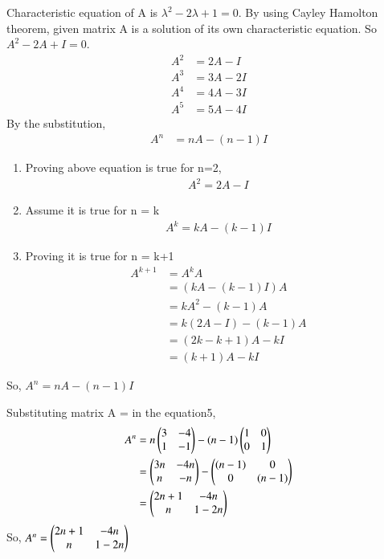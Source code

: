 Characteristic equation of A is $\lambda^2 - 2\lambda + 1 = 0$.
By using Cayley Hamolton theorem, given matrix A is a solution of its own characteristic equation. So $A^2 - 2A + I = 0$.
\begin {align}
	A^2 &= 2A - I  \\
	A^3 &= 3A - 2I \\
        A^4 &= 4A - 3I \\
	A^5 &= 5A - 4I
\end{align}
 By the substitution, 
\begin {align}
	A^n &= nA - (n-1)I 
\end{align}
\begin{enumerate}
\item Proving above equation is true for n=2,
\begin {align}
A^2 = 2A -I
\end {align}

\item Assume it is true for n = k
 \begin {align}
A^k = kA -(k-1)I
\end {align}

\item Proving it is true for n = k+1
 \begin {align}
A^{k+1} &= A^k A \\
        &= (kA -(k-1)I)A \\  
        &= kA^2 - (k-1)A \\
        &= k(2A -I) - (k-1)A \\
        &= (2k-k+1)A - kI \\
        &= (k+1)A - kI 
\end {align}
\end{enumerate}
 So, $A^n = nA - (n-1)I$ 

Substituting matrix A =  in the equation5,
\begin {align}
	A^n &= n\begin{pmatrix} 3 & -4 \\ 1 & -1 \end{pmatrix} - (n-1)\begin{pmatrix} 1 & 0 \\ 0 & 1 \end{pmatrix} \\
	    &=\begin{pmatrix} 3n & -4n \\ n & -n \end{pmatrix} - \begin{pmatrix} (n-1) & 0 \\ 0 & (n-1)\end{pmatrix} \\
	    &=\begin{pmatrix} 2n+1 & -4n \\ n & 1-2n \end{pmatrix}  
\end{align}
So, $A^n =\begin{pmatrix} 2n+1 & -4n \\ n & 1-2n \end{pmatrix}$  

